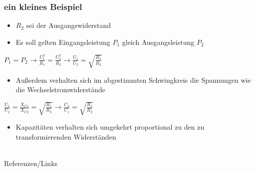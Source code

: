 \begin{frame}
\frametitle{ein kleines Beispiel}
\begin{itemize}
	\item	$R_2$ sei der Ausgangswiderstand
	\item	Es soll gelten Eingangsleistung $P_1$ gleich Ausgangsleistung $P_2$
\end{itemize}
\begin{Large}
	\begin{center}
		$P_1 = P_2 \rightarrow \frac{U^2_1}{R_1} = \frac{U^2_2}{R_2} \rightarrow \frac{U_1}{U_2} = \sqrt{\frac{R_1}{R_2}} $
	\end{center}
\end{Large}
\begin{itemize}
	\item	Außerdem verhalten sich im abgestimmten Schwingkreis die Spannungen wie die Wechselstromwiderstände
\end{itemize}
\begin{Large}
	\begin{center}
		$\frac{U_1}{U_2} = \frac{X_{C1}}{X_{C2}} = \sqrt{\frac{R_1}{R_2}} \rightarrow \frac{C_2}{C_1} = \sqrt{\frac{R_1}{R_2}}$
	\end{center}
\end{Large}
\begin{itemize}
	\item	Kapazitäten verhalten sich umgekehrt proportional zu den zu transformierenden Widerständen
\end{itemize}
\end{frame}

\renewcommand{\refname}{Referenzen}

\hypertarget{refs}{}
\textcolor{white}{} \\ %
\Large Referenzen/Links
\footnotesize

